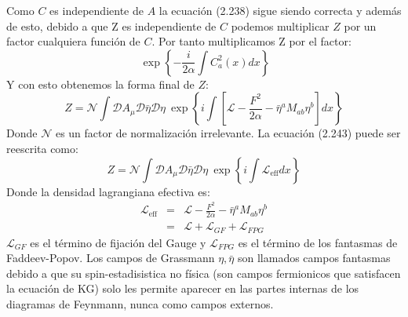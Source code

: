 Como $C$ es independiente de $A$ la ecuación (2.238) sigue siendo correcta y además de esto, debido a que Z es independiente de $C$ podemos multiplicar $Z$ por un factor cualquiera función de $C$. Por tanto multiplicamos Z por el factor:
\begin{equation}
\ \exp\left\{ -\frac{i}{2\alpha}\int C_{a}^{2}(x)dx\right\} 
\end{equation}
Y con esto obtenemos la forma final de $Z$:
\begin{equation}
Z=\mathcal{N}\int\mathcal{D}A_{\mu}\mathcal{D}\bar{\eta}\mathcal{D}\eta\ \exp\left\{ i\int[\mathcal{L}-\frac{F^{2}}{2\alpha}-\bar{\eta}^aM_{ab}\eta^{b}]dx\right\} 
\end{equation}
Donde $\mathcal{N}$ es un factor de normalización irrelevante. La ecuación (2.243) puede ser reescrita como:
\begin{equation}
Z=\mathcal{N}\int\mathcal{D}A_{\mu}\mathcal{D}\bar{\eta}\mathcal{D}\eta\ \exp\left\{ i\int\mathcal{L}_{\text{eff}}dx\right\}
\end{equation}
Donde la densidad lagrangiana efectiva es:
\begin{eqnarray}
\nonumber \mathcal{L}_{\text{eff}}&=&\mathcal{L}-\frac{F^{2}}{2\alpha}-\bar{\eta}^aM_{ab}\eta^{b}\\
&=& \mathcal{L}+\mathcal{L}_{GF}+\mathcal{L}_{FPG}
\end{eqnarray}
$\mathcal{L}_{GF}$ es el término de fijación del Gauge y $\mathcal{L}_{FPG}$ es el término de los fantasmas de Faddeev-Popov. Los campos de Grassmann $\eta,\bar{\eta}$ son llamados campos fantasmas debido a que su spin-estadisistica no física (son campos fermionicos que satisfacen la ecuación de KG) solo les permite aparecer en las partes internas de los diagramas de Feynmann, nunca como campos externos. 
